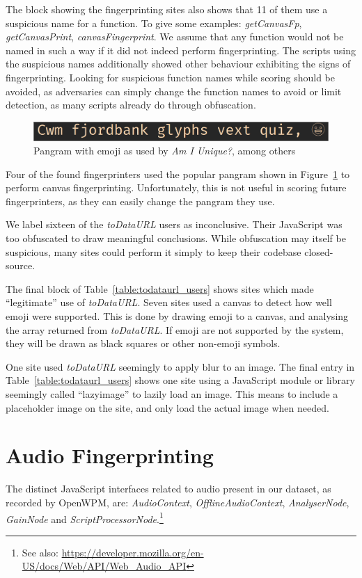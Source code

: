 \documentclass[
    fontsize=12pt,
    headings=small,
    parskip=half,
    bibliography=totoc,
    numbers=noenddot,
    open=any
    ]{scrreprt}
\begin{document}
The block showing the fingerprinting sites also shows that 11 of them
use a suspicious name for a function. To give some examples:
\textit{getCanvasFp}, \textit{getCanvasPrint}, \textit{canvasFingerprint}.
We assume that any function would not be named in such a way if it did not
indeed perform fingerprinting.
The scripts using the suspicious names additionally showed other behaviour
exhibiting the signs of fingerprinting.
Looking for suspicious function names while scoring should be avoided,
as adversaries can simply change the function names to avoid or
limit detection, as many scripts already do through obfuscation.

\begin{figure}
\centering
\includegraphics[scale=0.3]{images/fjordbank.png}
\caption{Pangram with emoji as used by \textit{Am I Unique?}, among others}
\label{code:pangram}
\end{figure}

Four of the found fingerprinters used the popular pangram shown in
Figure~\ref{code:pangram} to perform canvas fingerprinting.
Unfortunately, this is not useful in scoring future fingerprinters,
as they can easily change the pangram they use.

We label sixteen of the \textit{toDataURL} users as inconclusive.
Their JavaScript was too obfuscated to draw meaningful conclusions.
While obfuscation may itself be suspicious, many sites could perform
it simply to keep their codebase closed-source.

The final block of Table~\ref{table:todataurl_users} shows sites which
made ``legitimate'' use of \textit{toDataURL}. Seven sites used a canvas
to detect how well emoji were supported. This is done by drawing emoji
to a canvas, and analysing the array returned from \textit{toDataURL}.
If emoji are not supported by the system, they will be drawn as black
squares or other non-emoji symbols.

One site used \textit{toDataURL} seemingly to apply blur to an image.
The final entry in Table~\ref{table:todataurl_users} shows one site
using a JavaScript module or library seemingly called ``lazyimage''
to lazily load an image. This means to include a placeholder
image on the site, and only load the actual image when needed.


\section{Audio Fingerprinting}
\label{sec:audio_fingerprinting}
The distinct JavaScript interfaces related to audio present in our dataset,
as recorded by OpenWPM, are:
\textit{AudioContext},
\textit{OfflineAudioContext},
\textit{AnalyserNode},
\textit{GainNode} and \textit{ScriptProcessorNode}.\footnote{See also: \url{https://developer.mozilla.org/en-US/docs/Web/API/Web_Audio_API}}
\end{document}
